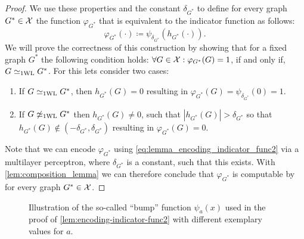 \begin{proof}
    We use these properties and the constant $\delta_{G^*}$ to define for every graph ${G^*} \in \mathcal{X}$ the function $\varphi_{G^*}$ that is equivalent to the indicator function as follows:
    \begin{equation*}
        \varphi_{G^*}(\cdot) \coloneqq \psi_{\delta_{G^*}} (h_{G^*}(\cdot)).
    \end{equation*}
    We will prove the correctness of this construction by showing that for a fixed graph $G^*$ the following condition holds: $\forall G 
    \in \mathcal{X}: \varphi_{G^*}(G) = 1$, if and only if, $G \simeq_{\text{1WL}} G^*$. For this lets consider two cases:
    \begin{enumerate}
        \item If $G \simeq_{\text{1WL}} G^*$, then $h_{G^*}(G) = 0$ resulting in $\varphi_{G^*}(G) = \psi_{\delta_{G^*}}(0) = 1$.
        \item If $G \not\simeq_{\text{1WL}} G^*$ then $h_{G^*}(G) \neq 0$, such that $|h_{G^*}(G)|> \delta_{G^*}$ so that $h_{G^*}(G) \not\in (-\delta_{G^*}, \delta_{G^*}) $ resulting in $\varphi_{G^*}(G) = 0$.
    \end{enumerate}
    Note that we can encode $\varphi_{G^*}$ using \cref{eq:lemma_encoding_indicator_func2} via a multilayer perceptron, where $\delta_{G^*}$ is a constant, such that this \mlp exists. With \cref{lem:composition_lemma} we can therefore conclude that $\varphi_{G^*}$ is computable by \wlnn for every graph ${G^*} \in \mathcal{X}$.
\end{proof}

\begin{figure}[!htb]
    \centering
    
    \caption{Illustration of the so-called ``bump'' function $\psi_a(x)$ used in the proof of \cref{lem:encoding-indicator-func2} with different exemplary values for $a$.}
    \label{fig:bump_function}
\end{figure}

